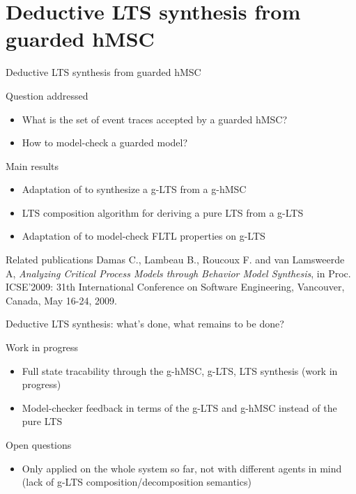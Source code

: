 \documentclass[11pt]{beamer}
\begin{document}
\section[Deductive Synthesis]{Deductive LTS synthesis from guarded hMSC}
\begin{frame}{Deductive LTS synthesis from guarded hMSC}
	\begin{block}{Question addressed}
		\begin{itemize}
			\item What is the set of event traces accepted by a guarded hMSC?
			\item How to model-check a guarded model?
		\end{itemize}
	\end{block}
	\begin{block}{Main results}
		\begin{itemize}
			\item Adaptation of \cite{Uchitel03} to synthesize a g-LTS from a g-hMSC
			\item LTS composition algorithm for deriving a pure LTS from a g-LTS
			\item Adaptation of \cite{Gianna03} to model-check FLTL properties on g-LTS
		\end{itemize}
	\end{block}
	\begin{block}{Related publications}
	   	\scriptsize
		Damas C., Lambeau B., Roucoux F. and van Lamsweerde A, \emph{Analyzing Critical Process Models through Behavior Model Synthesis},
		in Proc. ICSE'2009: 31th International Conference on Software Engineering, Vancouver, Canada, May 16-24, 2009. 
	\end{block}
\end{frame}

\begin{frame}{Deductive LTS synthesis: what's done, what remains to be done?}
	\begin{block}{Work in progress}
		\begin{itemize}
			\item Full state tracability through the g-hMSC, g-LTS, LTS synthesis (work in progress)
			\item Model-checker feedback in terms of the g-LTS and g-hMSC instead of the pure LTS
		\end{itemize}
	\end{block}
	\begin{block}{Open questions}
		\begin{itemize}
			\item Only applied on the whole system so far, not with different agents in mind (lack of g-LTS composition/decomposition semantics)
		\end{itemize}
	\end{block}
\end{frame}
\end{document}

